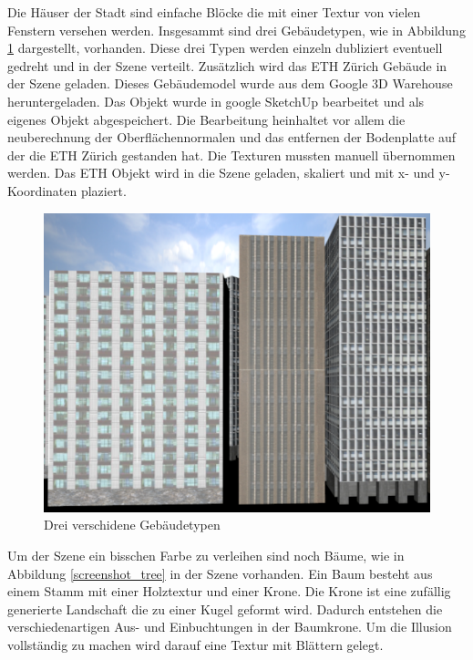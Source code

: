 Die Häuser der Stadt sind einfache Blöcke die mit einer Textur von vielen Fenstern versehen werden. Insgesammt sind drei Gebäudetypen, wie in Abbildung \ref{screenshot_buildings} dargestellt,  vorhanden. Diese drei Typen werden einzeln dubliziert eventuell gedreht und in der Szene verteilt. Zusätzlich wird das ETH Zürich Gebäude in der Szene geladen. Dieses Gebäudemodel wurde aus dem Google 3D Warehouse heruntergeladen. Das Objekt wurde in google SketchUp bearbeitet und als eigenes Objekt abgespeichert. Die Bearbeitung heinhaltet vor allem die neuberechnung der Oberflächennormalen und das entfernen der Bodenplatte auf der die ETH Zürich gestanden hat. Die Texturen mussten manuell übernommen werden. Das ETH Objekt wird in die Szene geladen, skaliert und mit x- und y-Koordinaten plaziert. 
\begin{figure}[htbp]
\centering 
\includegraphics[scale=0.4]{src/screenshot_buildings.png}
\caption{Drei verschidene Gebäudetypen} %
\label{screenshot_buildings} %
\end{figure}
Um der Szene ein bisschen Farbe zu verleihen sind noch Bäume, wie in Abbildung \ref{screenshot_tree} in der Szene vorhanden. Ein Baum besteht aus einem Stamm mit einer Holztextur und einer Krone. Die Krone ist eine zufällig generierte Landschaft die zu einer Kugel geformt wird. Dadurch entstehen die verschiedenartigen Aus- und Einbuchtungen in der Baumkrone. Um die Illusion vollständig zu machen wird darauf eine Textur mit Blättern gelegt.\\

